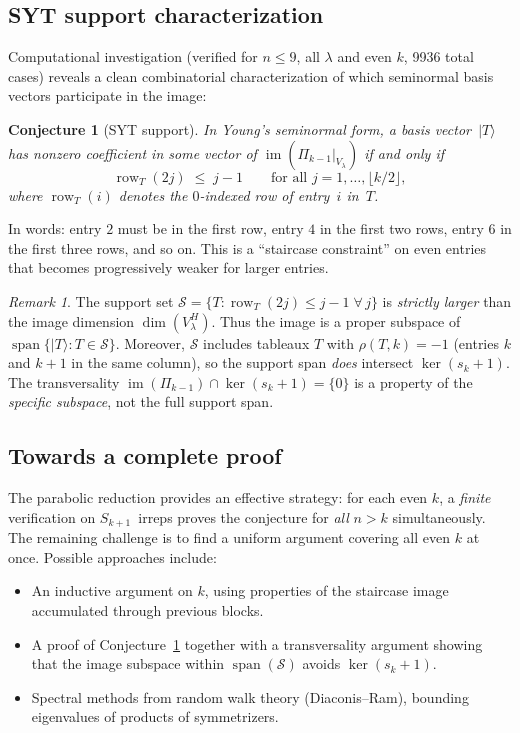 \documentclass[12pt]{article}
\newtheorem{conjecture}[theorem]{Conjecture}
\theoremstyle{definition}
\theoremstyle{remark}
\newtheorem{remark}[theorem]{Remark}
\begin{document}
\subsection*{SYT support characterization}

Computational investigation (verified for $n \le 9$, all $\lambda$ and even $k$,
9936 total cases) reveals a clean combinatorial characterization of which seminormal
basis vectors participate in the image:

\begin{conjecture}[SYT support]
\label{conj:syt-support}
In Young's seminormal form, a basis vector~$|T\rangle$ has nonzero coefficient in
some vector of $\operatorname{im}(\Pi_{k-1}|_{V_\lambda})$ if and only if
\[
  \operatorname{row}_T(2j) \;\le\; j - 1 \qquad \text{for all } j = 1, \ldots, \lfloor k/2 \rfloor,
\]
where $\operatorname{row}_T(i)$ denotes the $0$-indexed row of entry~$i$ in~$T$.
\end{conjecture}

In words: entry $2$ must be in the first row, entry $4$ in the first two rows,
entry $6$ in the first three rows, and so on.  This is a ``staircase constraint''
on even entries that becomes progressively weaker for larger entries.

\begin{remark}
The support set $\mathcal{S} = \{T : \operatorname{row}_T(2j) \le j-1\;\forall\, j\}$
is \emph{strictly larger} than the image dimension $\dim(V_\lambda^H)$.  Thus the
image is a proper subspace of $\operatorname{span}\{|T\rangle : T \in \mathcal{S}\}$.
Moreover, $\mathcal{S}$ includes tableaux $T$ with $\rho(T, k) = -1$ (entries $k$
and $k{+}1$ in the same column), so the support span \emph{does} intersect
$\ker(s_k + 1)$.  The transversality $\operatorname{im}(\Pi_{k-1}) \cap \ker(s_k + 1)
= \{0\}$ is a property of the \emph{specific subspace}, not the full support span.
\end{remark}

\subsection*{Towards a complete proof}

The parabolic reduction provides an effective strategy: for each even $k$,
a \emph{finite} verification on $S_{k+1}$~irreps proves the conjecture
for \emph{all} $n > k$ simultaneously.  The remaining challenge is to find
a uniform argument covering all even $k$ at once.  Possible approaches include:
\begin{itemize}
\item An inductive argument on $k$, using properties of the staircase image
  accumulated through previous blocks.
\item A proof of Conjecture~\ref{conj:syt-support} together with a transversality
  argument showing that the image subspace within $\operatorname{span}(\mathcal{S})$
  avoids $\ker(s_k + 1)$.
\item Spectral methods from random walk theory (Diaconis--Ram), bounding
  eigenvalues of products of symmetrizers.
\end{itemize}
\end{document}
